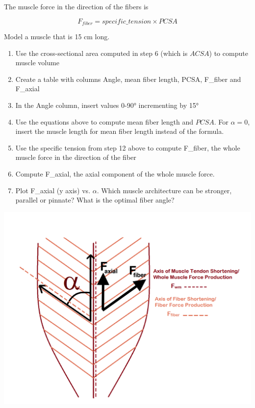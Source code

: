 \documentclass[]{book}
\providecommand{\tightlist}{%
  \setlength{\itemsep}{0pt}\setlength{\parskip}{0pt}}
\begin{document}
The muscle force in the direction of the fibers is

\begin{equation}
F_{fiber} = specific\_tension \times PCSA
\end{equation}

Model a muscle that is 15 cm long.

\begin{enumerate}
\def\labelenumi{\arabic{enumi}.}
\setcounter{enumi}{12}
\tightlist
\item
  Use the cross-sectional area computed in step 6 (which is \(ACSA\)) to
  compute muscle volume
\item
  Create a table with columns Angle, mean fiber length, PCSA, F\_fiber
  and F\_axial
\item
  In the Angle column, insert values 0-90° incrementing by 15°
\item
  Use the equations above to compute mean fiber length and \(PCSA\). For
  \(\alpha = 0\), insert the muscle length for mean fiber length instead
  of the formula.
\item
  Use the specific tension from step 12 above to compute F\_fiber, the
  whole muscle force in the direction of the fiber
\item
  Compute F\_axial, the axial component of the whole muscle force.
\item
  Plot F\_axial (y axis) vs. \(\alpha\). Which muscle architecture can
  be stronger, parallel or pinnate? What is the optimal fiber angle?
\end{enumerate}

\includegraphics{images/muscle.png}
\end{document}
